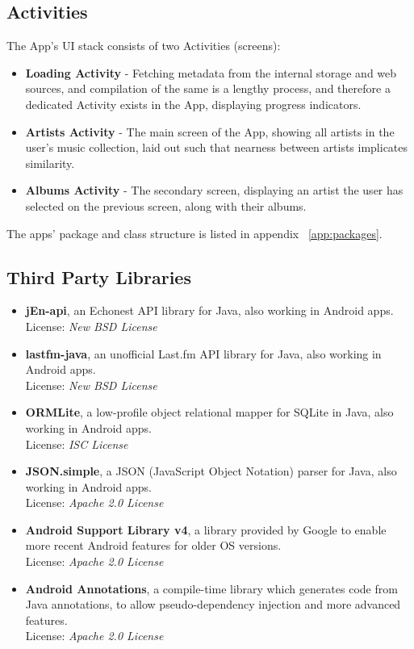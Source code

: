\subsection{Activities}

The App's UI stack consists of two Activities (screens):

\begin{itemize}
	\item \textbf{Loading Activity} - Fetching metadata from the internal storage and web sources, and compilation of the same is a lengthy process, and therefore a dedicated Activity exists in the App, displaying progress indicators.
	\item \textbf{Artists Activity} - The main screen of the App, showing all artists in the user's music collection, laid out such that nearness between artists implicates similarity.
	\item \textbf{Albums Activity} - The secondary screen, displaying an artist the user has selected on the previous screen, along with their albums.
\end{itemize}

The apps' package and class structure is listed in appendix ~\ref{app:packages}.

\subsection{Third Party Libraries}

\begin{itemize}
	
	\item \textbf{jEn-api}, an Echonest API library for Java, also working in Android apps. \\
License: \emph{New BSD License}

	\item \textbf{lastfm-java}, an unofficial Last.fm API library for Java, also working in Android apps. \\
License: \emph{New BSD License}

	\item \textbf{ORMLite}, a low-profile object relational mapper for SQLite in Java, also working in Android apps. \\
License: \emph{ISC License}

	\item \textbf{JSON.simple}, a JSON (JavaScript Object Notation) parser for Java, also working in Android apps. \\
License: \emph{Apache 2.0 License}

	\item \textbf{Android Support Library v4}, a library provided by Google to enable more recent Android features for older OS versions. \\
License: \emph{Apache 2.0 License}

	\item \textbf{Android Annotations}, a compile-time library which generates code from Java annotations, to allow pseudo-dependency injection and more advanced features. \\
License: \emph{Apache 2.0 License}

\end{itemize}

